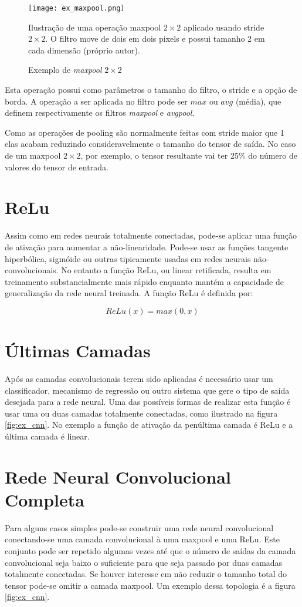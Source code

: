 \begin{figure}[!htb]
	\centering
	\texttt{[image: ex\_maxpool.png]}
	\caption{Exemplo de \emph{maxpool} $2 \times 2$}
	\label{fig:ex_maxpool}
	Ilustração de uma operação maxpool $2 \times 2$ aplicado usando stride
	$2 \times 2$. O filtro move de dois em dois pixels e possui
	tamanho 2 em cada dimensão (próprio autor).
\end{figure}

Esta operação possui como parâmetros o tamanho do filtro, o stride e a opção de
borda. A operação a ser aplicada no filtro pode ser $max$ ou $avg$ (média),
que definem respectivamente os filtros \emph{maxpool} e \emph{avgpool}.

Como as operações de pooling são normalmente feitas com stride maior que 1 elas
acabam reduzindo consideravelmente o tamanho do tensor de saída. No caso de um
maxpool $2 \times 2$, por exemplo, o tensor resultante vai ter 25\% do
número de valores do tensor de entrada.

\section{ReLu}
Assim como em redes neurais totalmente conectadas, pode-se aplicar uma função de
ativação para aumentar a não-linearidade. Pode-se usar as funções tangente
hiperbólica, sigmóide ou outras tipicamente usadas em redes neurais
não-convolucionais. No entanto a função ReLu, ou linear retificada, resulta em
treinamento substancialmente mais rápido enquanto mantém a capacidade de
generalização da rede neural treinada. A função ReLu é definida por:


\begin{equation}
	ReLu(x) = max(0,x)
\end{equation}

\section{Últimas Camadas}
Após as camadas convolucionais terem sido aplicadas é necessário usar um
classificador, mecanismo de regressão ou outro sistema que gere o tipo de saída
desejada para a rede neural. Uma das possíveis formas de realizar esta função é
usar uma ou duas camadas totalmente conectadas, como ilustrado na figura
\ref{fig:ex_cnn}. No exemplo a função de ativação da penúltima camada é
ReLu e a última camada é linear.

\section{Rede Neural Convolucional Completa}
Para alguns casos simples pode-se construir uma rede neural convolucional
conectando-se uma camada convolucional à uma maxpool e uma ReLu. Este conjunto
pode ser repetido algumas vezes até que o número de saídas da camada
convolucional seja baixo o suficiente para que seja passado por duas camadas
totalmente conectadas. Se houver interesse em não reduzir o tamanho total do
tensor pode-se omitir a camada maxpool. Um exemplo dessa topologia é a figura
\ref{fig:ex_cnn}.

